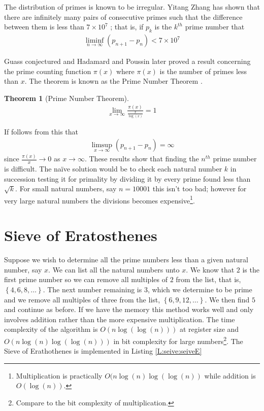 \documentclass[oneside,12pt]{book}   	%
\newcounter{ex}
\newcounter{pr}
\newtheorem{thm}{Theorem}[chapter]
\theoremstyle{definition}
\newcommand{\set}[1]{\left\{#1\right\}}
\begin{document}
\begin{spacing}{1.618}
			The distribution of primes is known to be irregular. Yitang Zhang has shown that there are infinitely many pairs of consecutive primes such that the difference between them is less than $7\times 10^7$ \cite{Zhang2013}; that is, if $p_k$ is the $k^{th}$ prime number that 
			\begin{alignat}{4}
				\liminf_{n\to\infty}(p_{n+1}-p_n)<7\times 10^7
			\end{alignat}
			
			 Guass conjectured and Hadamard and Poussin later proved a result concerning the prime counting function $\pi(x)$ where $\pi(x)$ is the number of primes less than $x$. The theorem is known as the Prime Number Theorem \cite{Andrews1971}.

			\begin{thm}[Prime Number Theorem]
				\begin{alignat}{4}
					\lim_{x\to\infty}\frac{\pi(x)}{\frac{x}{\log{(x)}}}=1
				\end{alignat} 
			\end{thm}
			If follows from this that 
			\begin{alignat}{4}
				\limsup_{x\to\infty}(p_{n+1}-p_n) = \infty
			\end{alignat}
			since $\frac{\pi(x)}{x}\to 0$ as $x\to \infty$. These results show that finding the $n^{th}$ prime number is difficult. The na\"ive solution would be to check each natural number $k$ in succession testing it for primality by dividing it by every prime found less than $\sqrt{k}$. For small natural numbers, say $n=10001$ this isn't too bad; however for very large natural numbers the divisions becomes expensive\footnote{Multiplication is practically $O(n\log{(n)}\log{(\log{(n)})}$ while addition is $O(\log{(n)})$. }. 
			
		\section{Sieve of Eratosthenes}\label{S:7:2}
		
			Suppose we wish to determine all the prime numbers less than a given natural number, say $x$. We can list all the natural numbers unto $x$. We know that $2$ is the first prime number so we can remove all multiples of $2$ from the list, that is, $\set{4, 6, 8, \dots}$. The next number remaining is $3$, which we determine to be prime and we remove all multiples of three from the list, $\set{6, 9, 12, \dots}$. We then find $5$ and continue as before. If we have the memory this method works well and only involves addition rather than the more expensive multiplication. The time complexity of the algorithm is $O(n\log{(\log{(n)})})$ at register size and $O(n\log{(n)}\log{(\log{(n)})})$ in bit complexity for large numbers\footnote{Compare to the bit complexity of multiplication.}. The Sieve of Erathothenes is implemented in Listing \ref{L:seive:seiveE}
			

\end{spacing}
\end{document}
